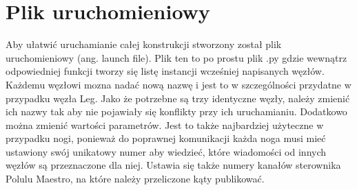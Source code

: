 \section{Plik uruchomieniowy}
Aby ułatwić uruchamianie całej konstrukcji stworzony został plik uruchomieniowy (ang. launch file). Plik ten to po prostu plik .py gdzie wewnątrz odpowiedniej funkcji tworzy się listę instancji wcześniej napisanych węzłów. Każdemu węzłowi mozna nadać nową nazwę i jest to w szczególności przydatne w przypadku węzła Leg. Jako że potrzebne są trzy identyczne węzły, należy zmienić ich nazwy tak aby nie pojawiały się konflikty przy ich uruchamianiu. Dodatkowo można zmienić wartości parametrów. Jest to także najbardziej użyteczne w przypadku nogi, ponieważ do poprawnej komunikacji każda noga musi mieć ustawiony swój unikatowy numer aby wiedzieć, które wiadomości od innych węzłów są przeznaczone dla niej. Ustawia się także numery kanałów sterownika Polulu Maestro, na które należy przeliczone kąty publikować.
